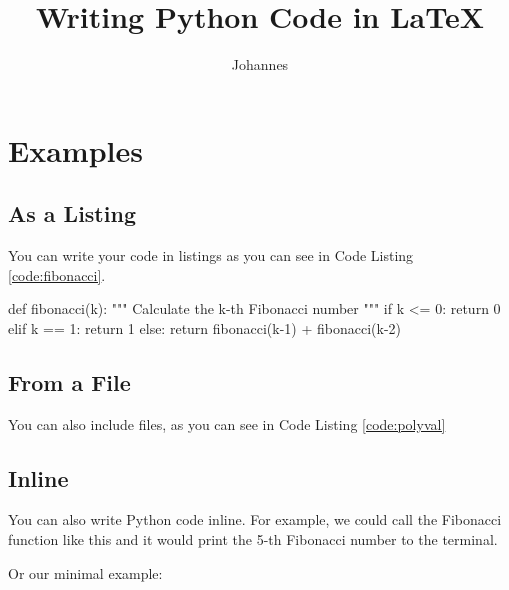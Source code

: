 \documentclass{article}
\begin{document}
\title{Writing Python Code in \LaTeX{}}
\author{Johannes}
\maketitle

\section{Examples}

\subsection{As a Listing}
You can write your code in listings as you can see in Code Listing \ref{code:fibonacci}.

\begin{python}[caption={This function calculates the k-th Fibonacci number recursively.}, label={code:fibonacci}]
def fibonacci(k):
    """ Calculate the k-th Fibonacci number """
    if k <= 0:
        return 0
    elif k == 1:
        return 1
    else:
        return fibonacci(k-1) + fibonacci(k-2)
\end{python}

\subsection{From a File}

You can also include files, as you can see in Code Listing \ref{code:polyval}


\subsection{Inline}

You can also write Python code inline. For example, we could call the Fibonacci function like this  and it would print the 5-th Fibonacci number to the terminal.

Or our minimal example: 
\end{document}
